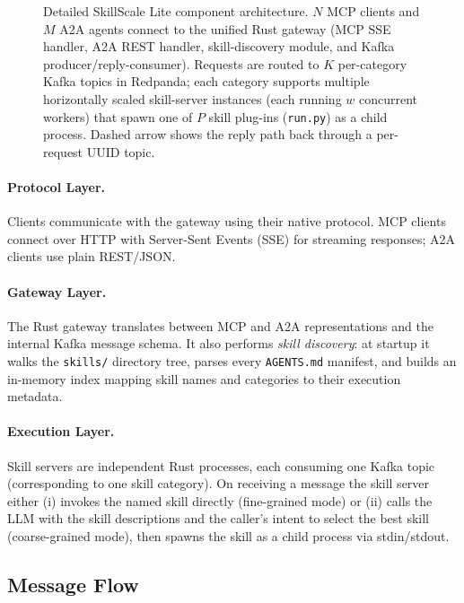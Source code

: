 \documentclass[sigconf,nonacm]{acmart}
\begin{document}
\begin{figure}[t]
\caption{Detailed SkillScale Lite component architecture. $N$ MCP clients and
  $M$ A2A agents connect to the unified Rust gateway (MCP SSE handler,
  A2A REST handler, skill-discovery module, and Kafka producer/reply-consumer).
  Requests are routed to $K$ per-category Kafka topics in Redpanda; each
  category supports multiple horizontally scaled skill-server instances (each
  running $w$ concurrent workers) that spawn one of $P$ skill plug-ins
  (\texttt{run.py}) as a child process.  Dashed arrow shows the reply path back
  through a per-request UUID topic.}
\label{fig:arch_detailed}
\end{figure}

\paragraph{Protocol Layer.} Clients communicate with the gateway using their native protocol. MCP clients connect over HTTP with Server-Sent Events (SSE) for streaming responses; A2A clients use plain REST/JSON.

\paragraph{Gateway Layer.} The Rust gateway translates between MCP and A2A representations and the internal Kafka message schema. It also performs \emph{skill discovery}: at startup it walks the \texttt{skills/} directory tree, parses every \texttt{AGENTS.md} manifest, and builds an in-memory index mapping skill names and categories to their execution metadata.

\paragraph{Execution Layer.} Skill servers are independent Rust processes, each consuming one Kafka topic (corresponding to one skill category). On receiving a message the skill server either (i) invokes the named skill directly (fine-grained mode) or (ii) calls the LLM with the skill descriptions and the caller's intent to select the best skill (coarse-grained mode), then spawns the skill as a child process via stdin/stdout.

\subsection{Message Flow}
\end{document}
